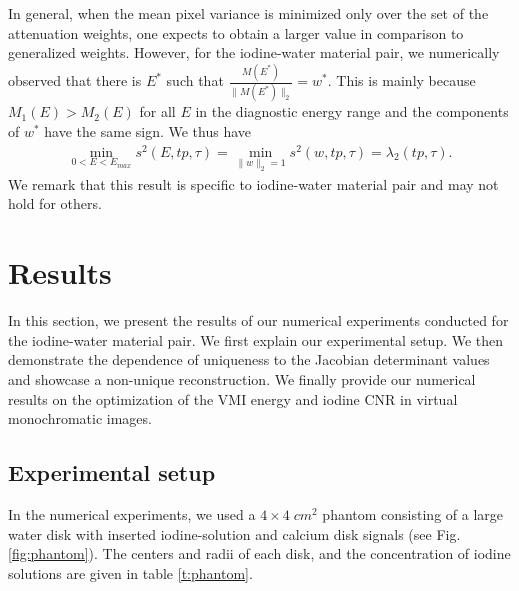 \documentclass[12pt,twoside]{article}   %
\begin{document}
In general, when the mean pixel variance is minimized only over the set of the attenuation weights, one expects to obtain a larger value in comparison to generalized weights. However, for the iodine-water material pair, we numerically observed that there is $E^*$ such that $\frac{M(E^*)}{\|M(E^*)\|_2} = w^*$. This is mainly because $M_1(E)>M_2(E)$ for all $E$ in the diagnostic energy range and the components of $w^*$ have the same sign. We thus have
\begin{align}\label{min_wE}
\min_{0<E<E_{max}} s^2(E,tp,\tau) = \min_{\|w\|_2=1} s^2(w,tp,\tau) = \lambda_2(tp,\tau).
\end{align} 
We remark that this result is specific to iodine-water material pair and may not hold for others.

\section{Results}\label{sec:results}
In this section, we present the results of our numerical experiments conducted for the iodine-water material pair. We first explain our experimental setup. We then demonstrate the dependence of uniqueness to the Jacobian determinant values and showcase a non-unique reconstruction. We finally provide our numerical results on the optimization of the VMI energy and iodine CNR in virtual monochromatic images.

\subsection{Experimental setup}\label{sec:experiment setup}
In the numerical experiments, we used a $4\times4\; cm^2$ phantom consisting of a large water disk with inserted iodine-solution and calcium disk signals (see Fig. \ref{fig:phantom}). The centers and radii of each disk, and the concentration of iodine solutions are given in table \ref{t:phantom}.
\end{document}
